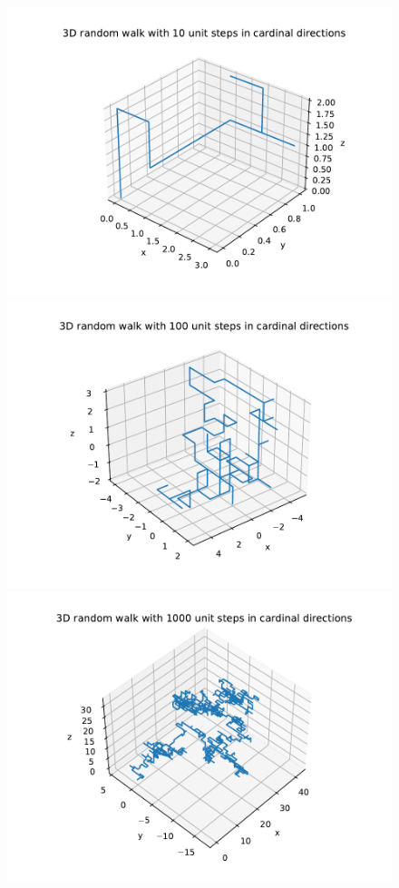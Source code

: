 \documentclass[a4paper,12pt]{article}
\begin{document}
\begin{figure}[!ht]
  \centering
  \begin{minipage}{0.49\textwidth}
    \includegraphics[width=\textwidth]{img/1-grid-10.pdf}
  \end{minipage}
  \begin{minipage}{0.49\textwidth}
    \includegraphics[width=\textwidth]{img/1-grid-100.pdf}
  \end{minipage}
  \includegraphics[scale=0.49]{img/1-grid-1000.pdf}
\end{figure}
\end{document}
